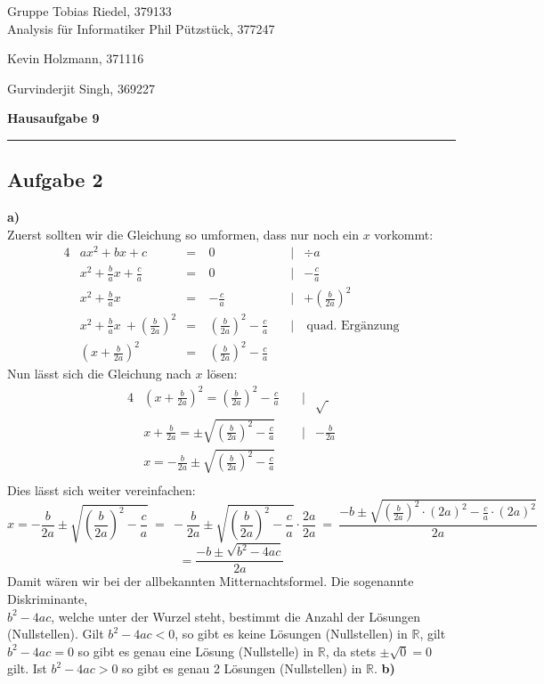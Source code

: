 \documentclass[a4paper,graphics,11pt]{article}
\newcommand{\aufgabe}[1]{\subsection*{Aufgabe #1}}
\begin{document}
\noindent Gruppe              \hfill Tobias Riedel, 379133 \\
\noindent Analysis für Informatiker             \hfill Phil Pützstück, 377247 \\
\strut\hfill Kevin Holzmann, 371116\\
\strut\hfill Gurvinderjit Singh, 369227
\begin{center}
	\LARGE{\textbf{Hausaufgabe 9}}
\end{center}
\begin{center}
\rule[0.1ex]{\textwidth}{1pt}
\end{center}



\aufgabe{2}
\textbf{a)}\\[5pt]
Zuerst sollten wir die Gleichung so umformen, dass nur noch ein $x$ vorkommt:
\begin{alignat*}{4}
    &ax^2+bx+c\ &=\ & 0 &|&\div a\\[2pt]
    &x^2+\frac{b}{a}x + \frac{c}{a}\ &=\ & 0 \quad &|& - \frac{c}{a}\\[2pt]
    &x^2+\frac{b}{a}x\ &=\ & -\frac{c}{a}&|& + \left(\frac{b}{2a}\right)^2\\[2pt]
    &x^2+\frac{b}{a}x\ + \left(\frac{b}{2a}\right)^2 &=\ & \left(\frac{b}{2a}\right)^2-\frac{c}{a}\quad&|&\ \text{quad. Ergänzung}\\[2pt]
    &\left(x+ \frac{b}{2a}\right)^2&=\ & \left(\frac{b}{2a}\right)^2-\frac{c}{a}\quad&&
\end{alignat*}
Nun lässt sich die Gleichung nach $x$ lösen:
\begin{alignat*}{4}
    &\left(x+\frac{b}{2a}\right)^2 = \left(\frac{b}{2a}\right)^2 - \frac{c}{a}\quad&|& \sqrt{\ }\\[2pt]
    &x+\frac{b}{2a} = \pm\sqrt{\left(\frac{b}{2a}\right)^2 - \frac{c}{a}}\quad&|& - \frac{b}{2a}\\[2pt]
    &x = -\frac{b}{2a}\pm\sqrt{\left(\frac{b}{2a}\right)^2 - \frac{c}{a}} \\[2pt]
\end{alignat*}
Dies lässt sich weiter vereinfachen:
$$
    x = -\frac{b}{2a} \pm \sqrt{\left(\frac{b}{2a}\right)^2 -\frac{c}{a}}
    \ =\ -\frac{b}{2a} \pm \sqrt{\left(\frac{b}{2a}\right)^2-\frac{c}{a}} \cdot \frac{2a}{2a}
    \ =\ \frac{-b\pm \sqrt{\left(\frac{b}{2a}\right)^2\cdot (2a)^2-\frac{c}{a}\cdot (2a)^2}}{2a}
$$$$
    = \frac{-b\pm \sqrt{b^2-4ac}}{2a}
$$
Damit wären wir bei der allbekannten Mitternachtsformel. Die sogenannte Diskriminante,\\
$b^2-4ac$, welche unter der Wurzel steht, bestimmt die Anzahl der Lösungen (Nullstellen).
Gilt $b^2-4ac < 0$, so gibt es keine Lösungen (Nullstellen) in $\mathbb{R}$, gilt $b^2-4ac = 0$ so
gibt es genau eine Lösung (Nullstelle) in $\mathbb{R}$, da stets $\pm\sqrt{0}= 0$ gilt. Ist $b^2-4ac > 0$ so gibt
es genau 2 Lösungen (Nullstellen) in $\mathbb{R}$.
\newpage
\textbf{b)}
\end{document}
